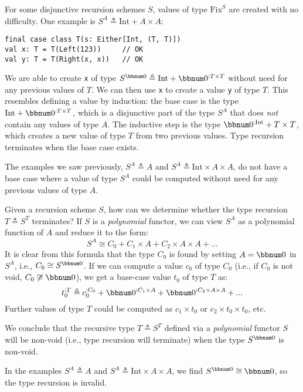 For some disjunctive recursion schemes $S$, values of type $\text{Fix}^{S}$
are created with no difficulty. One example is $S^{A}\triangleq\text{Int}+A\times A$:
\begin{lstlisting}
final case class T(s: Either[Int, (T, T)])
val x: T = T(Left(123))     // OK
val y: T = T(Right(x, x))   // OK
\end{lstlisting}
We are able to create \lstinline!x! of type $S^{\bbnum 0}\triangleq\text{Int}+\bbnum 0^{:T\times T}$
without need for any previous values of $T$. We can then use \lstinline!x!
to create a value \lstinline!y! of type $T$. This resembles defining
a value by induction: the base case is the type $\text{Int}+\bbnum 0^{:T\times T}$,
which is a disjunctive part of the type $S^{A}$ that does \emph{not}
contain any values of type $A$. The inductive step is the type $\bbnum 0^{:\text{Int}}+T\times T$,
which creates a new value of type $T$ from two previous values. Type
recursion terminates when the base case exists.

The examples we saw previously, $S^{A}\triangleq A$ and $S^{A}\triangleq\text{Int}\times A\times A$,
do not have a base case where a value of type $S^{A}$ could be computed
without need for any previous values of type $A$. 

Given a recursion scheme $S$, how can we
determine whether the type recursion $T\triangleq S^{T}$ terminates?
If $S$ is a \emph{polynomial} functor, we can view $S^{A}$ as a
polynomial function of $A$ and reduce it to the form:
\begin{equation}
S^{A}\cong C_{0}+C_{1}\times A+C_{2}\times A\times A+...\label{eq:functor-polynomial-normal-form}
\end{equation}
It is clear from this formula that the type $C_{0}$ is found by setting
$A=\bbnum 0$ in $S^{A}$, i.e., $C_{0}\cong S^{\bbnum 0}$. If we
can compute a value $c_{0}$ of type $C_{0}$ (i.e., if $C_{0}$ is
not void, $C_{0}\not\cong\bbnum 0$), we get a base-case value $t_{0}$
of type $T$ as:
\[
t_{0}^{:T}\triangleq c_{0}^{:C_{0}}+\bbnum 0^{:C_{1}\times A}+\bbnum 0^{:C_{2}\times A\times A}+...
\]
Further values of type $T$ could be computed as $c_{1}\times t_{0}$
or $c_{2}\times t_{0}\times t_{0}$, etc.

We conclude that the recursive type $T\triangleq S^{T}$ defined via
a \emph{polynomial} functor $S$ will be non-void (i.e., type recursion
will terminate) when the type $S^{\bbnum 0}$ is non-void.

In the examples $S^{A}\triangleq A$ and $S^{A}\triangleq\text{Int}\times A\times A$,
we find $S^{\bbnum 0}\cong\bbnum 0$, so the type recursion is invalid.

